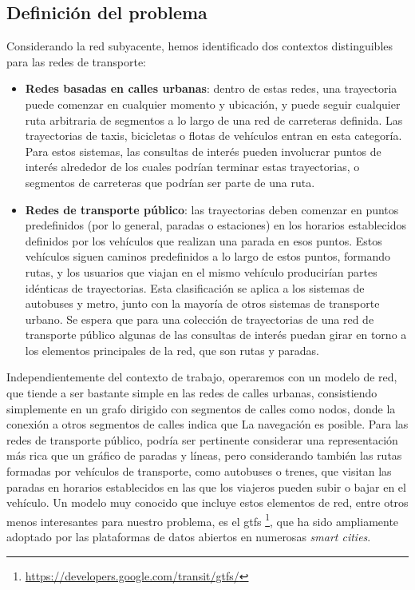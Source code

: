 \subsection{Definici\'on del problema}

    Considerando la red subyacente, hemos identificado dos contextos distinguibles para las redes de transporte:
    
    \begin{itemize}
    	\item \textbf{Redes basadas en calles urbanas}: dentro de estas redes, una trayectoria puede comenzar en cualquier momento y ubicaci\'on, y puede seguir cualquier ruta arbitraria de segmentos a lo largo de una red de carreteras definida.
        Las trayectorias de taxis, bicicletas o flotas de veh\'iculos entran en esta categor\'ia. Para estos sistemas, las consultas de inter\'es pueden involucrar puntos de inter\'es alrededor de los cuales podr\'ian terminar estas trayectorias, o segmentos de carreteras que podr\'ian ser parte de una ruta.
        
    	\item \textbf{Redes de transporte p\'ublico}: las trayectorias deben comenzar en puntos predefinidos (por lo general, paradas o estaciones) en los horarios establecidos definidos por los veh\'iculos que realizan una parada en esos puntos. Estos veh\'iculos siguen caminos predefinidos a lo largo de estos puntos, formando rutas, y los usuarios que viajan en el mismo veh\'iculo producir\'ian partes id\'enticas de trayectorias.
    Esta clasificaci\'on se aplica a los sistemas de autobuses y metro, junto con la mayor\'ia de otros sistemas de transporte urbano. Se espera que para una colecci\'on de trayectorias de una red de transporte p\'ublico algunas de las consultas de inter\'es puedan girar en torno a los elementos principales de la red, que son rutas y paradas.
    \end{itemize}
    
    Independientemente del contexto de trabajo, operaremos con un modelo de red, que tiende a ser bastante simple en las redes de calles urbanas, consistiendo simplemente en un grafo dirigido con segmentos de calles como nodos, donde la conexi\'on a otros segmentos de calles indica que La navegaci\'on es posible. Para las redes de transporte p\'ublico, podr\'ia ser pertinente considerar una representaci\'on m\'as rica que un gr\'afico de paradas y l\'ineas, pero considerando tambi\'en las rutas formadas por veh\'iculos de transporte, como autobuses o trenes, que visitan las paradas en horarios establecidos en las que los viajeros pueden subir o bajar en el veh\'iculo. Un modelo muy conocido que incluye estos elementos de red, entre otros menos interesantes para nuestro problema, es el \gls{gtfs} \footnote{\url{https://developers.google.com/transit/gtfs/}}, que ha sido ampliamente adoptado por las plataformas de datos abiertos en numerosas \textit{smart cities}.
    

